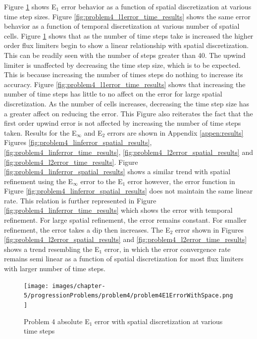 Figure \ref{fig:problem4_l1error_spatial_results} shows E${}_{1}$ error behavior as a function of spatial discretization at various time step sizes. Figure \ref{fig:problem4_l1error_time_results} shows the same error behavior as a function of temporal discretization at various number of spatial cells. Figure \ref{fig:problem4_l1error_spatial_results} shows that as the number of time steps take is increased the higher order flux limiters begin to show a linear relationship with spatial discretization. This can be readily seen with the number of steps greater than 40. The upwind limiter is unaffected by decreasing the time step size, which is to be expected. This is because increasing the number of times steps do nothing to increase its accuracy. Figure \ref{fig:problem4_l1error_time_results} shows that increasing the number of time steps has little to no affect on the error for large spatial discretization. As the number of cells increases, decreasing the time step size has a greater affect on reducing the error. This Figure also reiterates the fact that the first order upwind error is not affected by increasing the number of time steps taken. Results for the E${}_{\infty}$ and E${}_{2}$ errors are shown in Appendix \ref{appen:results} Figures \ref{fig:problem4_linferror_spatial_results}, \ref{fig:problem4_linferror_time_results}, \ref{fig:problem4_l2error_spatial_results} and \ref{fig:problem4_l2error_time_results}. Figure \ref{fig:problem4_linferror_spatial_results} shows a similar trend with spatial refinement using the E${}_{\infty}$ error to the E${}_{1}$ error however, the error function in Figure \ref{fig:problem4_linferror_spatial_results} does not maintain the same linear rate. This relation is further represented in Figure \ref{fig:problem4_linferror_time_results} which shows the error with temporal refinement. For large spatial refinement, the error remains constant. For smaller refinement, the error takes a dip then increases. The E${}_{2}$ error shown in Figures \ref{fig:problem4_l2error_spatial_results} and \ref{fig:problem4_l2error_time_results} shows a trend resembling the E${}_{1}$ error, in which the error convergence rate remains semi linear as a function of spatial discretization for most flux limiters with larger number of time steps. 

\clearpage

\begin{figure}[p]
    \centering
    \texttt{[image: images/chapter-5/progressionProblems/problem4/problem4E1ErrorWithSpace.png]}
    \caption{Problem 4 absolute E${}_{1}$ error with spatial discretization at various time steps }
    \label{fig:problem4_l1error_spatial_results}
\end{figure}

